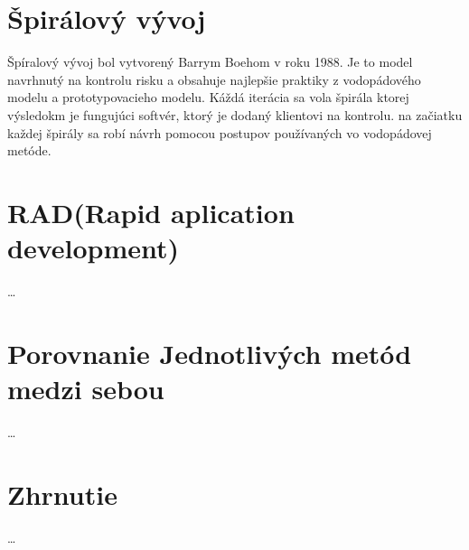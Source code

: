 \documentclass[10pt,oneside,slovak,a4paper]{article}
\begin{document}
\section{Špirálový vývoj}\label{spiral}
Špíralový vývoj bol vytvorený Barrym Boehom v roku 1988. Je to model navrhnutý na kontrolu risku a obsahuje najlepšie praktiky z vodopádového modelu a prototypovacieho modelu. Káždá iterácia sa vola špirála ktorej výsledokm je fungujúci softvér, ktorý je dodaný klientovi na kontrolu. na začiatku každej špirály sa robí návrh pomocou postupov používaných vo vodopádovej metóde.
\section{ RAD(Rapid aplication development)}\label{RAD}
\ldots
\section{Porovnanie Jednotlivých metód medzi sebou}\label{porovnávanie}
\ldots
\section{Zhrnutie}\label{zaver}
\ldots


\end{document}
